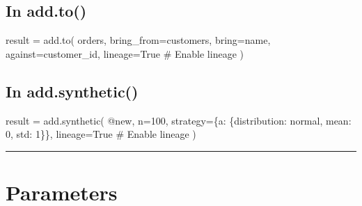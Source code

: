 \documentclass[
  letterpaper,
]{scrbook}
\newenvironment{Shaded}{\begin{snugshade}}{\end{snugshade}}
\newcommand{\CommentTok}[1]{\textcolor[rgb]{0.37,0.37,0.37}{#1}}
\newcommand{\DecValTok}[1]{\textcolor[rgb]{0.68,0.00,0.00}{#1}}
\newcommand{\NormalTok}[1]{\textcolor[rgb]{0.00,0.23,0.31}{#1}}
\newcommand{\OperatorTok}[1]{\textcolor[rgb]{0.37,0.37,0.37}{#1}}
\newcommand{\StringTok}[1]{\textcolor[rgb]{0.13,0.47,0.30}{#1}}
\newcommand{\VariableTok}[1]{\textcolor[rgb]{0.07,0.07,0.07}{#1}}
\begin{document}
\subsection{In add.to()}\label{in-add.to-1}

\begin{Shaded}
\begin{Highlighting}[]
\NormalTok{result }\OperatorTok{=}\NormalTok{ add.to(}
\NormalTok{    orders,}
\NormalTok{    bring\_from}\OperatorTok{=}\NormalTok{customers,}
\NormalTok{    bring}\OperatorTok{=}\StringTok{\textquotesingle{}name\textquotesingle{}}\NormalTok{,}
\NormalTok{    against}\OperatorTok{=}\StringTok{\textquotesingle{}customer\_id\textquotesingle{}}\NormalTok{,}
\NormalTok{    lineage}\OperatorTok{=}\VariableTok{True}  \CommentTok{\# Enable lineage}
\NormalTok{)}
\end{Highlighting}
\end{Shaded}

\subsection{In add.synthetic()}\label{in-add.synthetic-1}

\begin{Shaded}
\begin{Highlighting}[]
\NormalTok{result }\OperatorTok{=}\NormalTok{ add.synthetic(}
    \StringTok{\textquotesingle{}@new\textquotesingle{}}\NormalTok{,}
\NormalTok{    n}\OperatorTok{=}\DecValTok{100}\NormalTok{,}
\NormalTok{    strategy}\OperatorTok{=}\NormalTok{\{}\StringTok{\textquotesingle{}a\textquotesingle{}}\NormalTok{: \{}\StringTok{\textquotesingle{}distribution\textquotesingle{}}\NormalTok{: }\StringTok{\textquotesingle{}normal\textquotesingle{}}\NormalTok{, }\StringTok{\textquotesingle{}mean\textquotesingle{}}\NormalTok{: }\DecValTok{0}\NormalTok{, }\StringTok{\textquotesingle{}std\textquotesingle{}}\NormalTok{: }\DecValTok{1}\NormalTok{\}\},}
\NormalTok{    lineage}\OperatorTok{=}\VariableTok{True}  \CommentTok{\# Enable lineage}
\NormalTok{)}
\end{Highlighting}
\end{Shaded}

\begin{center}\rule{0.5\linewidth}{0.5pt}\end{center}

\section{Parameters}\label{parameters-7}
\end{document}
